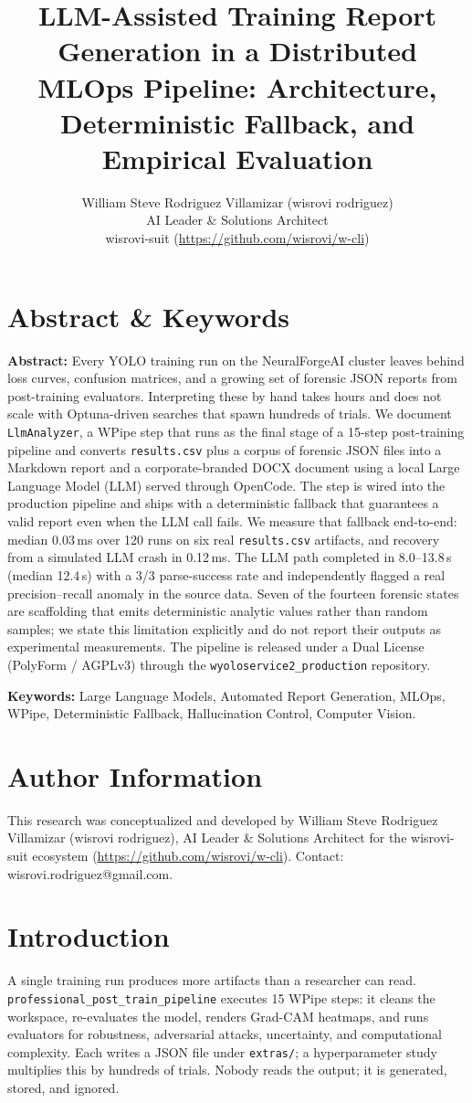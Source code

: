 \documentclass[10pt,twocolumn,letterpaper]{article}
\title{LLM-Assisted Training Report Generation in a Distributed MLOps Pipeline: Architecture, Deterministic Fallback, and Empirical Evaluation}
\author{William Steve Rodriguez Villamizar (wisrovi rodriguez)\\AI Leader \& Solutions Architect\\wisrovi-suit (\url{https://github.com/wisrovi/w-cli})}
\date{}
\begin{document}
\maketitle

\section{Abstract \& Keywords}
\textbf{Abstract:} Every YOLO training run on the NeuralForgeAI cluster leaves behind loss curves, confusion matrices, and a growing set of forensic JSON reports from post-training evaluators. Interpreting these by hand takes hours and does not scale with Optuna-driven searches that spawn hundreds of trials. We document \texttt{LlmAnalyzer}, a WPipe step that runs as the final stage of a 15-step post-training pipeline and converts \texttt{results.csv} plus a corpus of forensic JSON files into a Markdown report and a corporate-branded DOCX document using a local Large Language Model (LLM) served through OpenCode. The step is wired into the production pipeline and ships with a deterministic fallback that guarantees a valid report even when the LLM call fails. We measure that fallback end-to-end: median 0.03\,ms over 120 runs on six real \texttt{results.csv} artifacts, and recovery from a simulated LLM crash in 0.12\,ms. The LLM path completed in 8.0--13.8\,s (median 12.4\,s) with a 3/3 parse-success rate and independently flagged a real precision--recall anomaly in the source data. Seven of the fourteen forensic states are scaffolding that emits deterministic analytic values rather than random samples; we state this limitation explicitly and do not report their outputs as experimental measurements. The pipeline is released under a Dual License (PolyForm / AGPLv3) through the \texttt{wyoloservice2\_production} repository.

\textbf{Keywords:} Large Language Models, Automated Report Generation, MLOps, WPipe, Deterministic Fallback, Hallucination Control, Computer Vision.

\section{Author Information}
This research was conceptualized and developed by William Steve Rodriguez Villamizar (wisrovi rodriguez), AI Leader \& Solutions Architect for the wisrovi-suit ecosystem (\url{https://github.com/wisrovi/w-cli}). Contact: wisrovi.rodriguez@gmail.com.

\section{Introduction}
A single training run produces more artifacts than a researcher can read. \texttt{professional\_post\_train\_pipeline} executes 15 WPipe steps: it cleans the workspace, re-evaluates the model, renders Grad-CAM heatmaps, and runs evaluators for robustness, adversarial attacks, uncertainty, and computational complexity. Each writes a JSON file under \texttt{extras/}; a hyperparameter study multiplies this by hundreds of trials. Nobody reads the output; it is generated, stored, and ignored.
\end{document}
